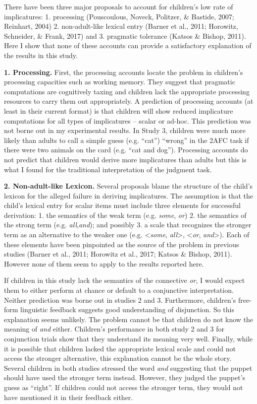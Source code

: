 \documentclass[man]{apa6}
\theoremstyle{definition}
\theoremstyle{definition}
\theoremstyle{definition}
\theoremstyle{remark}
\begin{document}
There have been three major proposals to account for children's low rate
of implicatures: 1. processing (Pouscoulous, Noveck, Politzer, \&
Bastide, 2007; Reinhart, 2004) 2. non-adult-like lexical entry (Barner
et al., 2011; Horowitz, Schneider, \& Frank, 2017) and 3. pragmatic
tolerance (Katsos \& Bishop, 2011). Here I show that none of these
accounts can provide a satisfactory explanation of the results in this
study.

\textbf{1. Processing.} First, the processing accounts locate the
problem in children's processing capacities such as working memory. They
suggest that pragmatic computations are cognitively taxing and children
lack the appropriate processing resources to carry them out
appropriately. A prediction of processing accounts (at least in their
current format) is that children will show reduced implicature
computations for all types of implicatures -- scalar or ad-hoc. This
prediction was not borne out in my experimental results. In Study 3,
children were much more likely than adults to call a simple guess (e.g.
\enquote{cat}) \enquote{wrong} in the 2AFC task if there were two
animals on the card (e.g. \enquote{cat and dog}). Processing accounts do
not predict that children would derive more implicatures than adults but
this is what I found for the traditional interpretation of the judgment
task.

\textbf{2. Non-adult-like Lexicon.} Several proposals blame the
structure of the child's lexicon for the alleged failure in deriving
implicatures. The assumption is that the child's lexical entry for
scalar items must include three elements for successful derivation: 1.
the semantics of the weak term (e.g. \emph{some}, \emph{or}) 2. the
semantics of the strong term (e.g. \emph{all},\emph{and}); and possibly
3. a scale that recognizes the stronger term as an alternative to the
weaker one (e.g. \textless{}\emph{some}, \emph{all}\textgreater{},
\textless{}\emph{or}, \emph{and}\textgreater{}). Each of these elements
have been pinpointed as the source of the problem in previous studies
(Barner et al., 2011; Horowitz et al., 2017; Katsos \& Bishop, 2011).
However none of them seem to apply to the results reported here.

If children in this study lack the semantics of the connective
\emph{or}, I would expect them to either perform at chance or default to
a conjunctive interpretation. Neither prediction was borne out in
studies 2 and 3. Furthermore, children's free-form linguistic feedback
suggests good understanding of disjunction. So this explanation seems
unlikely. The problem cannot be that children do not know the meaning of
\emph{and} either. Children's performance in both study 2 and 3 for
conjunction trials show that they understand its meaning very well.
Finally, while it is possible that children lacked the appropriate
lexical scale and could not access the stronger alternative, this
explanation cannot be the whole story. Several children in both studies
stressed the word \emph{and} suggesting that the puppet should have used
the stronger term instead. However, they judged the puppet's guess as
\enquote{right}. If children could not access the stronger term, they
would not have mentioned it in their feedback either.
\end{document}
